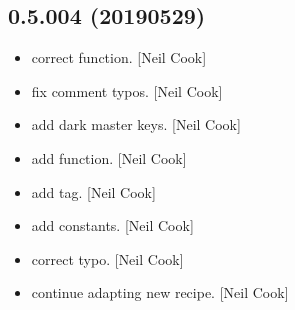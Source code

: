 \documentclass[a4paper,10pt,english]{report}
\begin{document}
\subsection{0.5.004 (2019\sphinxhyphen{}05\sphinxhyphen{}29)}
\label{\detokenize{misc/changelog:id151}}\begin{itemize}
\item {} 
 \sphinxhyphen{} correct  function. {[}Neil Cook{]}

\item {} 
 \sphinxhyphen{} fix comment typos. {[}Neil Cook{]}

\item {} 
 \sphinxhyphen{} add dark master keys. {[}Neil Cook{]}

\item {} 
 \sphinxhyphen{} add  function. {[}Neil Cook{]}

\item {} 
 \sphinxhyphen{} add  tag. {[}Neil Cook{]}

\item {} 
 \sphinxhyphen{} add  constants. {[}Neil Cook{]}

\item {} 
 \sphinxhyphen{} correct typo. {[}Neil Cook{]}

\item {} 
 \sphinxhyphen{} continue adapting new recipe. {[}Neil Cook{]}

\end{itemize}
\end{document}
